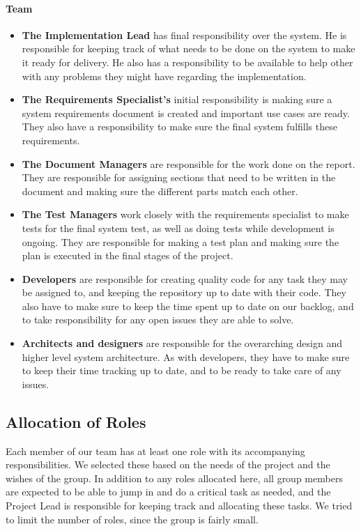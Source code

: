 \paragraph{Team}
\begin{itemize}
    \item \textbf{The Implementation Lead} has  final responsibility over the system. He is responsible for keeping track of what needs to be done on the system to make it ready for delivery. He also has a responsibility to be available to help other with any problems they might have regarding the implementation.
    \item \textbf{The Requirements Specialist's} initial responsibility is making sure a system requirements document is created and important use cases are ready. They also have a responsibility to make sure the final system fulfills these requirements.
    \item \textbf{The Document Managers} are responsible for the work done on the report. They are responsible for assigning sections that need to be written in the document and making sure the different parts match each other.
    \item \textbf{The Test Managers} work closely with the requirements specialist to make tests for the final system test, as well as doing tests while development is ongoing. They are responsible for making a test plan and making sure the plan is executed in the final stages of the project.
    \item \textbf{Developers} are responsible for creating quality code for any task they may be assigned to, and keeping the repository up to date with their code. They also have to make sure to keep the time spent up to date on our backlog, and to take responsibility for any open issues they are able to solve.
    \item \textbf{Architects and designers} are responsible for the overarching design and higher level system architecture. As with developers, they have to make sure to keep their time tracking up to date, and to be ready to take care of any issues.
\end{itemize}

\subsection{Allocation of Roles}
\label{subsec:IntroGroupOrgAllocation}
Each member of our team has at least one role with its accompanying responsibilities. We selected these based on the needs of the project and the wishes of the group. In addition to any roles allocated here, all group members are expected to be able to jump in and do a critical task as needed, and the Project Lead is responsible for keeping track and allocating these tasks. We tried to limit the number of roles, since the group is fairly small.

